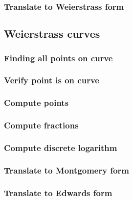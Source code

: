 \documentclass{article}
\begin{document}
\subsubsection{Translate to Weierstrass form}

\subsection{Weierstrass curves}
\subsubsection{Finding all points on curve}
\subsubsection{Verify point is on curve}
\subsubsection{Compute points}
\subsubsection{Compute fractions}
\subsubsection{Compute discrete logarithm}
\subsubsection{Translate to Montgomery form}
\subsubsection{Translate to Edwards form}
\end{document}
